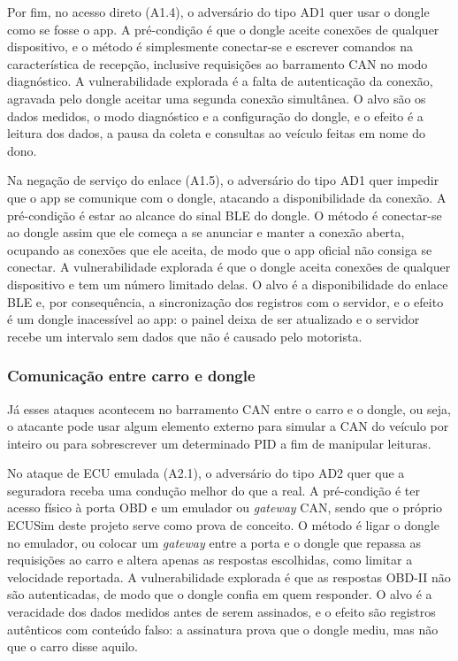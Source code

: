 \documentclass[
	12pt,
	article,			%
	oneside,
	a4paper,
	english,
	brazil				%
	]{abntex2}
\begin{document}
Por fim, no acesso direto (A1.4), o adversário do tipo AD1 quer usar o dongle como se fosse o app. A pré-condição é que o dongle aceite conexões
de qualquer dispositivo, e o método é simplesmente conectar-se e escrever comandos na característica de recepção, inclusive requisições ao
barramento CAN no modo diagnóstico. A vulnerabilidade explorada é a falta de autenticação da conexão, agravada pelo dongle aceitar uma
segunda conexão simultânea. O alvo são os dados medidos, o modo diagnóstico e a configuração do dongle, e o efeito é a leitura dos dados,
a pausa da coleta e consultas ao veículo feitas em nome do dono.

Na negação de serviço do enlace (A1.5), o adversário do tipo AD1 quer impedir que o app se comunique com o dongle, atacando a
disponibilidade da conexão. A pré-condição é estar ao alcance do sinal BLE do dongle. O método é conectar-se ao dongle assim que ele
começa a se anunciar e manter a conexão aberta, ocupando as conexões que ele aceita, de modo que o app oficial não consiga se conectar. 
A vulnerabilidade explorada é que o dongle aceita conexões de qualquer dispositivo e tem um número limitado delas. O alvo é a disponibilidade 
do enlace BLE e, por consequência, a sincronização dos registros com o servidor, e o efeito é um dongle inacessível ao app: o painel deixa de 
ser atualizado e o servidor recebe um intervalo sem dados que não é causado pelo motorista.

\subsubsection{Comunicação entre carro e dongle} \label{secsec:comunicacao-carro-dongle}

Já esses ataques acontecem no barramento CAN entre o carro e o dongle, ou seja, o atacante pode
usar algum elemento externo para simular a CAN do veículo por inteiro ou para sobrescrever um determinado PID a fim de
manipular leituras.

No ataque de ECU emulada (A2.1), o adversário do tipo AD2 quer que a seguradora receba uma condução melhor do que a real. A pré-condição é ter
acesso físico à porta OBD e um emulador ou \textit{gateway} CAN, sendo que o próprio ECUSim deste projeto serve como prova de conceito.
O método é ligar o dongle no emulador, ou colocar um \textit{gateway} entre a porta e o dongle que repassa as requisições ao carro e altera
apenas as respostas escolhidas, como limitar a velocidade reportada. A vulnerabilidade explorada é que as respostas OBD-II não são
autenticadas, de modo que o dongle confia em quem responder. O alvo é a veracidade dos dados medidos antes de serem assinados, e o efeito
são registros autênticos com conteúdo falso: a assinatura prova que o dongle mediu, mas não que o carro disse aquilo.
\end{document}
